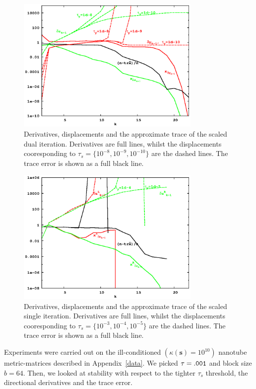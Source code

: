 \documentclass[letterpaper,twocolumn,amsmath,amsfont,amssymb,english,aps,jcp,preprintnumbers,groupaddress,nofootinbib,tightenlines,floatfix]{revtex4}
\newcommand{\mat}[1]{\boldsymbol{#1}}
\theoremstyle{plain}
\theoremstyle{remark}
\theoremstyle{plain}
\begin{document}
\begin{figure}[h] 
\includegraphics[width=3.5in]{fig_33_tube_cond_10_scaled/33_tube_k10_scale_dual.eps}
\caption{Derivatives, displacements and the approximate trace of the scaled dual iteration.
Derivatives are full lines, whilst the displacements cooresponding to $\tau_s=\{10^{-8}, 10^{-9}, 10^{-10}\}$
are the dashed lines.  The trace error is shown as a full black line. }\label{flow_unscaled_dual}
\end{figure}

\begin{figure}[h]
\includegraphics[width=3.5in]{fig_33_tube_cond_10_scaled/33_tube_k10_scale_stab.eps}
\caption{Derivatives, displacements and the approximate trace of the scaled single iteration.
Derivatives are full lines, whilst the displacements cooresponding to $\tau_s=\{10^{-3}, 10^{-4}, 10^{-5}\}$
are the dashed lines.  The trace error is shown as a full black line. }\label{flow_scaled_dual}
\end{figure}

Experiments were carried out on the ill-conditioned $(\kappa(\mat{s})=10^{10})$ nanotube metric-matrices described in Appendix~\ref{data}.
We picked  $\tau ={\tt .001}$ and block size $b = 64$.  Then, we looked at stability with respect to the tighter $\tau_s$ threshold, 
the directional derivatives and the trace error.   
\end{document}
